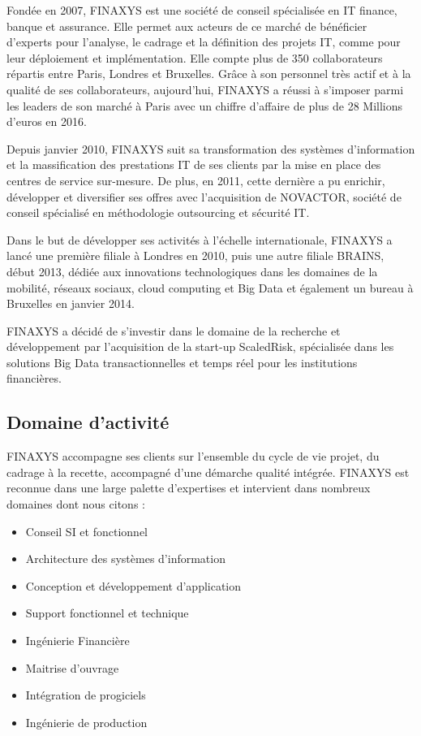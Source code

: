 Fondée en 2007, FINAXYS est une société de conseil spécialisée en IT finance, banque et assurance. Elle permet aux acteurs de ce marché de bénéficier d’experts pour l’analyse, le cadrage et la définition des projets IT, comme pour leur déploiement et implémentation. Elle compte plus de 350 collaborateurs répartis entre Paris, Londres et Bruxelles. Grâce à son personnel très actif et à la qualité de ses collaborateurs, aujourd’hui, FINAXYS a réussi à s’imposer parmi les leaders de son marché à Paris avec un chiffre d’affaire de plus de 28 Millions d’euros en 2016. 
\par Depuis janvier 2010, FINAXYS suit sa transformation des systèmes d’information et la massification des prestations IT de ses clients par la mise en place des centres de service sur-mesure. De plus, en 2011, cette dernière a pu enrichir, développer et diversifier ses offres avec l’acquisition de NOVACTOR, société de conseil spécialisé en méthodologie outsourcing et sécurité IT. 
\par Dans le but de développer ses activités à l’échelle internationale, FINAXYS a lancé une première filiale à Londres en 2010, puis une autre filiale BRAINS, début 2013, dédiée aux innovations technologiques dans les domaines de la mobilité, réseaux sociaux, cloud computing et Big Data et également un bureau à Bruxelles en janvier 2014.
\par FINAXYS a décidé de s’investir dans le domaine de la recherche et développement par l’acquisition de la start-up ScaledRisk, spécialisée dans les solutions Big Data transactionnelles et temps réel pour les institutions financières.


\subsection{Domaine d'activité}
FINAXYS accompagne ses clients sur l’ensemble du cycle de vie projet, du cadrage à la recette, accompagné d’une démarche qualité intégrée. FINAXYS est reconnue dans une large palette d’expertises et intervient dans nombreux domaines dont nous citons :
\begin{itemize}  
    \item Conseil SI et fonctionnel
    \item Architecture des systèmes d’information
    \item Conception et développement d’application
    \item Support fonctionnel et technique
    \item Ingénierie Financière
    \item Maitrise d’ouvrage
    \item Intégration de progiciels
    \item Ingénierie de production
\end{itemize}


